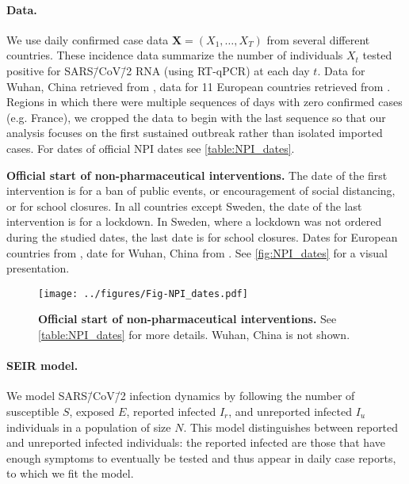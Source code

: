 \documentclass[12pt]{extarticle}
\let\vec\mathbf
\begin{document}
\paragraph*{Data.} 
We use daily confirmed case data $\vec{X}=(X_1, \ldots, X_T)$ from several different countries. These incidence data summarize the number of individuals $X_t$ tested positive for SARS\=/CoV\=/2 RNA (using RT-qPCR) at each day $t$.
Data for Wuhan, China retrieved from \citet{Pei2020}, data for 11 European countries retrieved from \citet{Flaxman2020}. 
Regions in which there were multiple sequences of days with zero confirmed cases (e.g. France), we cropped the data to begin with the last sequence so that our analysis focuses on the first sustained outbreak rather than isolated imported cases. 
For dates of official NPI dates see \autoref{table:NPI_dates}.


 
\begin{table}[h]
\centering
{}
\caption{
\textbf{Official start of non-pharmaceutical interventions.}
The date of the first intervention is for a ban of public events, or encouragement of social distancing, or for school closures.
In all countries except Sweden, the date of the last intervention is for a lockdown. In Sweden, where a lockdown was not ordered during the studied dates, the last date is for school closures. Dates for European countries from \citet{Flaxman2020}, date for Wuhan, China from \citet{Pei2020}. See \autoref{fig:NPI_dates} for a visual presentation.
}
\label{table:NPI_dates}
\end{table}



\begin{figure}[h]
    \centering
	\texttt{[image: ../figures/Fig-NPI\_dates.pdf]}
    \caption{
    \textbf{Official start of non-pharmaceutical interventions.}
	See \autoref{table:NPI_dates} for more details. Wuhan, China is not shown.
    } 
    \label{fig:NPI_dates}
\end{figure}



\paragraph*{SEIR model.} \label{sec:model}
We model SARS\=/CoV\=/2 infection dynamics by following the number of susceptible $S$, exposed $E$, reported infected $I_r$, and unreported infected $I_u$ individuals in a population of size $N$.
This model distinguishes between reported and unreported infected individuals: the reported infected are those that have enough symptoms to eventually be tested and thus appear in daily case reports, to which we fit the model.
\end{document}
